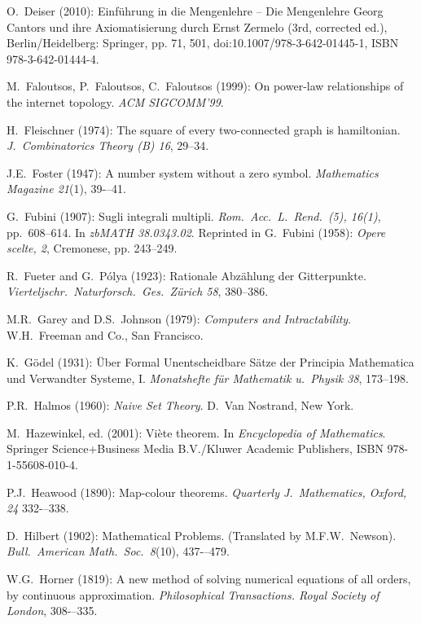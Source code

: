\begin{thebibliography}{999}
O.~Deiser (2010): Einf\"{u}hrung in die Mengenlehre – Die Mengenlehre
Georg Cantors und ihre Axiomatisierung durch Ernst Zermelo (3rd,
corrected ed.), Berlin/Heidelberg: Springer, pp. 71, 501,
doi:10.1007/978-3-642-01445-1, ISBN 978-3-642-01444-4.




M.~Faloutsos, P.~Faloutsos, C.~Faloutsos (1999):
On power-law relationships of the internet topology.  {\it ACM
  SIGCOMM'99}.

H.~Fleischner (1974):
The square of every two-connected graph is hamiltonian.
{\it J.~Combinatorics Theory (B) 16}, 29--34.

J.E.~Foster (1947): A number system without a zero symbol.
{\it Mathematics Magazine 21}(1), 39-–41.

G.~Fubini (1907): Sugli integrali multipli.
{\it Rom.~Acc.~L.~Rend.~(5), 16(1)}, pp.~608–614.  In {\it zbMATH
  38.0343.02}.  Reprinted in
G.~Fubini (1958): {\it Opere scelte, 2}, Cremonese, pp. 243–249.

R.~Fueter and G.~P\'{o}lya (1923):
Rationale Abz\"{a}hlung der Gitterpunkte.  {\it
Vierteljschr.~Naturforsch.~Ges.~Z\"{u}rich 58}, 380--386.


M.R.~Garey and D.S.~Johnson (1979):
{\it Computers and Intractability}.
W.H.~Freeman and Co., San Francisco.

K.~G\"{o}del (1931): \"{U}ber Formal Unentscheidbare S\"{a}tze der
Principia Mathematica und Verwandter Systeme, I.  {\it Monatshefte
f\"{u}r Mathematik u.~Physik 38}, 173--198.



P.R.~Halmos (1960):
{\it Naive Set Theory}.
D.~Van Nostrand, New York.

M.~Hazewinkel, ed. (2001): %
Vi\`{e}te theorem.  In {\it Encyclopedia of Mathematics}.
Springer Science+Business Media B.V./Kluwer Academic Publishers,
ISBN 978-1-55608-010-4.

P.J.~Heawood (1890):
Map-colour theorems.  {\it Quarterly J.~Mathematics, Oxford, 24}
332-–338.

D.~Hilbert (1902): Mathematical Problems.  (Translated by
M.F.W.~Newson).  {\it Bull.~American Math.~Soc.~8}(10), 437-–479.

W.G.~Horner (1819): 
A new method of solving numerical equations of all orders, by
continuous approximation. {\it Philosophical Transactions. Royal
Society of London}, 308-–335.


\end{thebibliography}
